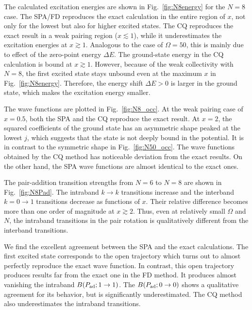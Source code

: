 \documentclass[%
superscriptaddress,
preprint,
showpacs,
nofootinbib,
amsmath,amssymb,
aps,
prc,
floatfix ]%
{revtex4-1}
\begin{document}
The calculated excitation energies are shown in Fig.~\ref{fig:N8energy}
for the $N=8$ case.
The SPA/FD reproduces the exact calculation in the entire region of $x$,
not only for the lowest but also for higher excited states.
The CQ reproduces the exact result in a weak pairing region ($x\lesssim 1$),
while it underestimates the excitation energies at $x\gtrsim 1$.
Analogous to the case of $\Omega=50$,
this is mainly due to effect of the zero-point energy $\Delta E$.
The ground-state energy in the CQ calculation 
is bound at $x\gtrsim 1$.
However, because of the weak collectivity with $N=8$,
the first excited state stays unbound even at the maximum $x$ in 
Fig.~\ref{fig:N8energy}.
Therefore, the energy shift $\Delta E>0$ is larger in the ground state,
which makes the excitation energy smaller.

The wave functions are plotted in Fig.~\ref{fig:N8_occ}. 
At the weak pairing case of $x=0.5$,
both the SPA and the CQ reproduce the exact result.
At $x=2$, the squared coefficients of the ground state has an
asymmetric shape peaked at the
lowest $j$, which suggests that the state is not deeply bound in the
potential.
It is in contrast to the symmetric shape in Fig.~\ref{fig:N50_occ}.
The wave functions obtained by the CQ method has noticeable deviation
from the exact results.
On the other hand, the SPA wave functions are almost identical to the
exact ones.



The pair-addition transition strengths from $N=6$ to $N=8$ are
shown in Fig.~\ref{fig:N8Pad}.
The intraband $k\rightarrow k$ transitions increase and 
the interband $k=0\rightarrow 1$ transitions decrease as
functions of $x$.
Their relative difference becomes
more than one order of magnitude at $x\gtrsim 2$.
Thus, even at relatively small $\Omega$ and $N$,
the intraband transitions in the pair rotation is qualitatively different
from the interband transitions.

We find the excellent agreement between the SPA and the exact calculations.
The first excited state corresponds to the open trajectory which
turns out to almost perfectly reproduce the exact wave function.
In contrast, this open trajectory produces results far from the exact
one in the FD method.
It produces almost vanishing the intraband
$B(P_{\rm ad}; 1\rightarrow 1)$.
The $B(P_{\rm ad}; 0\rightarrow 0)$ shows a qualitative agreement for
its behavior, but is significantly underestimated.
The CQ method also underestimates the intraband transitions.
\end{document}
